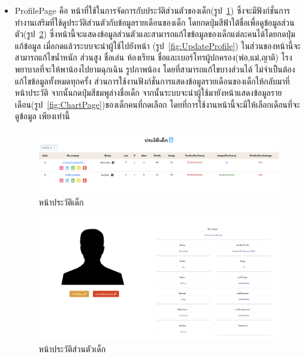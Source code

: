 \begin{itemize}
  
  \item  ProfilePage คือ หน้าที่ใช้ในการจัดการกับประวัติส่วนตัวของเด็ก(รูป~\ref{fig:Profile}) ซึ่งจะมีฟังก์ชั่นการทำงานเสริมที่ใช้ดูประวัติส่วนตัวกับข้อมูลรายเดือนของเด็ก
  โดยกดปุ่มสีฟ้าใต้ชื่อเพื่อดูข้อมูลส่วนตัว(รูป~\ref{fig:ProfileTwo}) ซึ่งหน้านี้จะแสดงข้อมูลส่วนตัวและสามารถแก้ไขข้อมูลของเด็กแต่ละคนได้โดยกดปุ่มแก้ข้อมูล เมื่อกดแล้วระบบจะนำผู้ใช้ไปยังหน้า (รูป~\ref{fig:UpdateProfile}) 
  ในส่วนของหน้านี้จะสามารถแก้ไขน้ำหนัก ส่วนสูง ชื่อเล่น ห้องเรียน ชื่อและเบอร์โทรผู้ปกครอง(พ่อ,แม่,ญาติ) โรงพยาบาลที่จะให้พาน้องไปยามฉุกเฉิน รูปภาพน้อง 
  โดยที่สามารถแก้ไขบางส่วนได้ ไม่จำเป็นต้องแก้ไขข้อมูลทั้งหมดทุกครั้ง 
  ส่วนการใช้งานฟังก์ชั่นการแสดงข้อมูลรายเดือนของเด็กให้กลับมาที่หน้าประวัติ จากนั้นกดปุ่มสีชมพูล่างชื่อเด็ก
  จากนั้นระบบจะนำผู้ใช้มายังหน้าแสดงข้อมูลรายเดือน(รูป~\ref{fig:ChartPage})ของเด็กคนที่กดเลือก โดยที่การใช้งานหน้านี้จะมีให้เลือกเดือนที่จะดูข้อมูล เพียงเท่านี้

  
    \begin{figure}
      \begin{center}
      \includegraphics[width=\linewidth]{images/Profile.png}
      \end{center}
      \caption[หน้าประวัติเด็ก]{หน้าประวัติเด็ก}
      \label{fig:Profile}
    \end{figure}
  
  
  
    \begin{figure}
      \begin{center}
      \includegraphics[width=\linewidth]{images/ProfileInfo.png}
      \end{center}
      \caption[หน้าประวัติส่วนตัวเด็ก]{หน้าประวัติส่วนตัวเด็ก}
      \label{fig:ProfileTwo}
    \end{figure}
  

\end{itemize}
